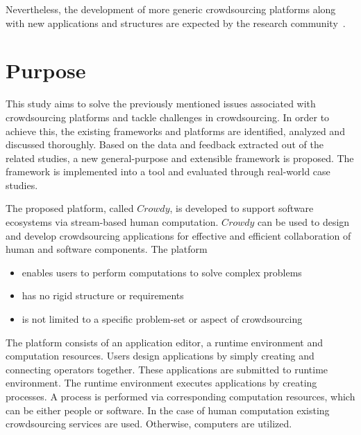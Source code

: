 
 
Nevertheless, the development of more generic crowdsourcing platforms 
along with new applications and structures are expected 
by the research community~\cite{Doan2011}.


\section{Purpose}

This study aims to solve the previously mentioned issues associated with 
crowdsourcing platforms and tackle challenges in crowdsourcing. In order to 
achieve this, the existing frameworks and platforms are identified, analyzed 
and discussed thoroughly. Based on the data and feedback extracted out of 
the related studies, a new general-purpose and extensible framework is 
proposed. The framework is implemented into a tool and evaluated through 
real-world case studies.

The proposed platform, called $Crowdy$, is developed to support software 
ecosystems via stream-based human computation. $Crowdy$ can be used 
to design and develop crowdsourcing applications for effective and efficient 
collaboration of human and software components. The platform
\begin{itemize}
	\item enables users to perform computations to solve complex problems
	\item has no rigid structure or requirements
	\item is not limited to a specific problem-set or aspect of crowdsourcing
\end{itemize}

The platform consists of an application editor, a runtime 
environment and computation resources. Users design applications by simply 
creating and connecting operators together. These applications are submitted to runtime 
environment. The runtime environment executes applications by creating processes. 
A process is performed via corresponding computation resources, which can be either 
people or software. In the case of human computation existing crowdsourcing services 
are used. Otherwise, computers are utilized.

